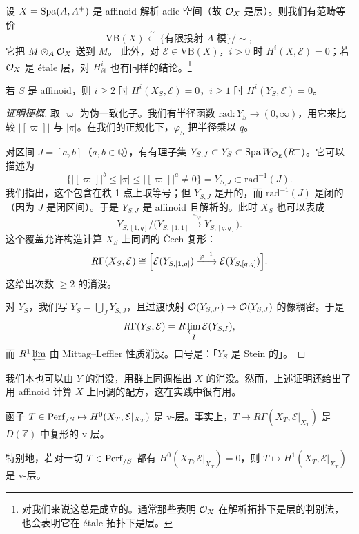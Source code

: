 \begin{theorem}
设 $X=\operatorname{Spa}(A,A^+)$ 是 affinoid 解析 adic 空间（故 $\mathcal{O}_X$ 是层）。则我们有范畴等价
\[
\mathrm{VB}(X)\xleftarrow{\ \sim\ }\{\text{有限投射 }A\text{-模}\}/\sim,
\]
它把 $M\otimes_A\mathcal{O}_X$ 送到 $M$。
此外，对 $\mathcal{E}\in\mathrm{VB}(X)$，$i>0$ 时 $H^i(X,\mathcal{E})=0$；若 $\mathcal{O}_X$ 是 étale 层，对 $H^i_{\text{ét}}$ 也有同样的结论。\footnote{对我们来说这总是成立的。通常那些表明 $\mathcal{O}_X$ 在解析拓扑下是层的判别法，也会表明它在 étale 拓扑下是层。}
\end{theorem}

\begin{proposition}
若 $S$ 是 affinoid，则 $i\ge2$ 时 $H^i(X_S,\mathcal{E})=0$，$i\ge1$ 时 $H^i(Y_S,\mathcal{E})=0$。
\end{proposition}

\begin{proof}[证明梗概]
取 $\varpi$ 为伪一致化子。我们有半径函数 $\mathrm{rad}\colon Y_S\to(0,\infty)$，用它来比较 $|[\varpi]|$ 与 $|\pi|$。在我们的正规化下，$\varphi_S$ 把半径乘以 $q$。

对区间 $J=[a,b]$（$a,b\in\mathbb{Q}$），有有理子集 $Y_{S,J}\subset Y_S\subset\operatorname{Spa} W_{\mathcal{O}_E}(R^+)$。它可以描述为
\[
\{|[\varpi]|^b\le|\pi|\le|[\varpi]|^a\neq0\}=Y_{S,J}\subset\mathrm{rad}^{-1}(J).
\]
我们指出，这个包含在秩 1 点上取等号；但 $Y_{S,J}$ 是开的，而 $\mathrm{rad}^{-1}(J)$ 是闭的（因为 $J$ 是闭区间）。于是 $Y_{S,J}$ 是 affinoid 且解析的。此时 $X_S$ 也可以表成
\[
Y_{S,[1,q]}\big/\bigl(Y_{S,[1,1]}\xrightarrow{\sim_\varphi}Y_{S,[q,q]}\bigr).
\]
这个覆盖允许构造计算 $X_S$ 上同调的 \v{C}ech 复形：
\[
R\Gamma(X_S,\mathcal{E})\cong
\Bigl[\mathcal{E}(Y_{S,[1,q]})\xrightarrow{\varphi^{-1}}\mathcal{E}(Y_{S,[q,q]})\Bigr].
\]
这给出次数 $\ge2$ 的消没。

对 $Y_S$，我们写 $Y_S=\bigcup_J Y_{S,J}$，且过渡映射 $\mathcal{O}(Y_{S,J'})\to\mathcal{O}(Y_{S,J})$ 的像稠密。于是
\[
R\Gamma(Y_S,\mathcal{E})=R\varprojlim_{I}\mathcal{E}(Y_{S,I}),
\]
而 $R^1\varprojlim$ 由 Mittag--Leffler 性质消没。口号是：「$Y_S$ 是 Stein 的」。
\end{proof}

\begin{remark}
我们本也可以由 $Y$ 的消没，用群上同调推出 $X$ 的消没。然而，上述证明还给出了用 affinoid 计算 $X$ 上同调的配方，这在实践中很有用。
\end{remark}


\begin{proposition}
函子 $T\in\mathrm{Perf}_{/S}\mapsto H^0(X_T,\mathcal{E}|_{X_T})$ 是 v-层。事实上，$T\mapsto R\Gamma(X_T,\mathcal{E}|_{X_T})$ 是 $D(\mathbb{Z})$ 中复形的 v-层。

特别地，若对一切 $T\in\mathrm{Perf}_{/S}$ 都有 $H^0(X_T,\mathcal{E}|_{X_T})=0$，则 $T\mapsto H^1(X_T,\mathcal{E}|_{X_T})$ 是 v-层。
\end{proposition}

